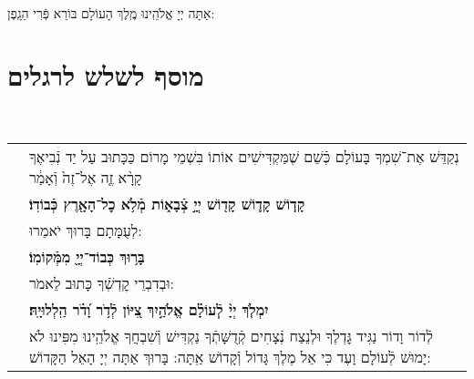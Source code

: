 \documentclass[twoside, openany, parskip=half, 11pt]{book}
\begin{document}
\\
אַתָּה יְיָ אֱלֹהֵֽינוּ מֶֽלֶךְ הָעוֹלָם בּוֹרֵא פְּֿרִי הַגָֽפֶן:

\chapter[מוסף לשלש רגלים]{ מוסף לשלש לרגלים ‎}
\label{musaphregel}



\specialsaavos

\specialsameisim
\nextpage
{}
\\

\begin{small}
	\setlength{\LTpost}{0pt}
	\begin{tabular}{ l p{} }
		
		\shatz &
		נְקַדֵּשׁ אֶת־שִׁמְךָ בָּעוֹלָם כְּֿשֵׁם שֶׁמַּקְדִּישִׁים אוֹתוֹ בִּשְׁמֵי מָרוֹם כַּכָּתוּב עַל יַד נְֿבִיאֶךָ קָרָ֨א זֶ֤ה אֶל־זֶה֙ וְֿאָמַ֔ר \\
		
		\vshatzkahal &
		\textbf{ קָד֧וֹשׁ קָד֛וֹשׁ קָד֖וֹשׁ יְיָ֣ צְֿבָא֑וֹת מְֿלֹ֥א כׇל־הָאָ֖רֶץ כְּֿבוֹדֽוֹ׃} \\
		
		\shatz &
		לְעֻמָּתָם בָּרוּךְ יֹאמֵרוּ: \\
		
		\vshatzkahal &
		\textbf{ בָּר֥וּךְ כְּבוֹד־יְיָ֖ מִמְּֿקוֹמֽוֹ׃} \\
		
		
		\shatz &
		וּבְדִבְרֵי קׇדְשְֿׁךָ כָּתוּב לֵאמֹר: \\
		
		\vshatzkahal &
		\textbf{יִמְלֹ֤ךְ יְיָ֨ לְֽֿעוֹלָ֗ם אֱלֹהַ֣יִךְ צִ֭יּוֹן לְֿדֹ֥ר וָ֝דֹ֗ר הַֽלְלוּיָֽהּ׃}\\
		
		\shatz &
		לְֿדוֹר וָדוֹר נַגִּיד גׇּדְלֶךָ וּלְנֵצַח נְֿצָחִים קְֿדֻשָּׁתְֿךָ נַקְדִּישׁ וְֿשִׁבְחֲךָ אֱלֹהֵֽינוּ מִפִּינוּ לֹא יָמוּשׁ לְֿעוֹלָם וָעֶד כִּי אֵל מֶלֶךְ גָּדוֹל וְֿקָדוֹשׁ אַֽתָּה: בָּרוּךְ אַתָּה יְיָ הָאֵל הַקָּדוֹשׁ:
		\instruction{אתה בחרתנו...}
	\end{tabular}
\end{small}
\end{document}
